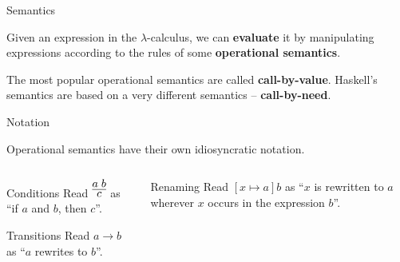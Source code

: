 %
\begin{frame}{Semantics}

Given an expression in the $\lambda$-calculus, we can \textbf{evaluate} it by
manipulating expressions according to the rules of some \textbf{operational
semantics}.

The most popular operational semantics are called \textbf{call-by-value}.
Haskell's semantics are based on a very different semantics --
\textbf{call-by-need}.

\end{frame}

%
\begin{frame}{Notation}

Operational semantics have their own idiosyncratic notation.

\begin{columns}[t]
\begin{column}{0.5\textwidth}

\begin{block}{Conditions}
Read $\infer{c}{a \; b}$ as ``if $a$ and $b$, then $c$''.
\end{block}

\begin{block}{Transitions}
Read $a \to b$ as ``$a$ rewrites to $b$''.
\end{block}

\end{column}
\begin{column}{0.4\textwidth}

\begin{block}{Renaming}
Read $[x \mapsto a] b$ as ``$x$ is rewritten to $a$ wherever $x$ occurs in the 
expression $b$''.
\end{block}

\end{column}
\end{columns}

\end{frame}


